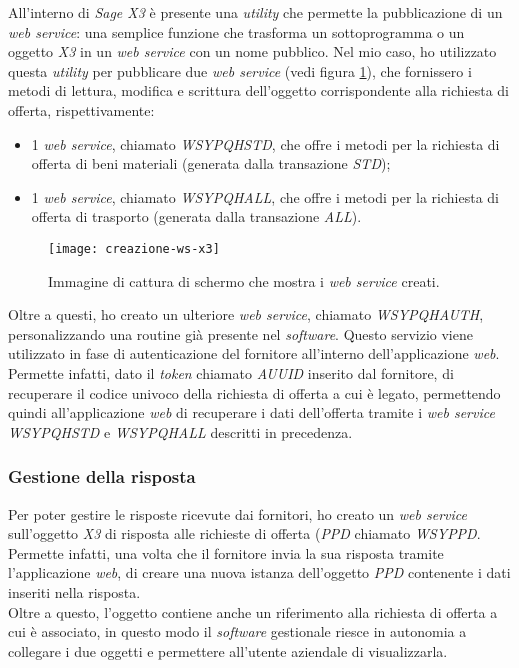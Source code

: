 All'interno di \textit{Sage X3} è presente una \textit{utility} che permette la pubblicazione di un \textit{web service}: una semplice funzione che trasforma un sottoprogramma o un oggetto \textit{X3} in un \textit{web service} con un nome pubblico.
Nel mio caso, ho utilizzato questa \textit{utility} per pubblicare due \textit{web service} (vedi figura \ref{fig:ws-creati}), che fornissero i metodi di lettura, modifica e scrittura dell'oggetto corrispondente alla richiesta di offerta, rispettivamente:
\begin{itemize}
	\item 1 \textit{web service}, chiamato \textit{WSYPQHSTD}, che offre i metodi per la richiesta di offerta di beni materiali (generata dalla transazione \textit{STD}); 
	\item 1 \textit{web service}, chiamato \textit{WSYPQHALL}, che offre i metodi per la richiesta di offerta di trasporto (generata dalla transazione \textit{ALL}).
\end{itemize}


\begin{figure}[htbp]
	\begin{center}
		\texttt{[image: creazione-ws-x3]}
		\caption{Immagine di cattura di schermo che mostra i \textit{web service} creati.}
		\label{fig:ws-creati}
	\end{center}
\end{figure}

Oltre a questi, ho creato un ulteriore \textit{web service}, chiamato \textit{WSYPQHAUTH}, personalizzando una routine già presente nel \textit{software}. 
Questo servizio viene utilizzato in fase di autenticazione del fornitore all'interno dell'applicazione \textit{web}. 
Permette infatti, dato il \textit{token} chiamato \textit{AUUID} inserito dal fornitore, di recuperare il codice univoco della richiesta di offerta a cui è legato, permettendo quindi all'applicazione \textit{web} di recuperare i dati dell'offerta tramite i \textit{web service} \textit{WSYPQHSTD} e \textit{WSYPQHALL} descritti in precedenza.

\subsubsection{Gestione della risposta}
Per poter gestire le risposte ricevute dai fornitori, ho creato un \textit{web service} sull'oggetto \textit{X3} di risposta alle richieste di offerta (\textit{PPD} chiamato \textit{WSYPPD}.
Permette infatti, una volta che il fornitore invia la sua risposta tramite l'applicazione \textit{web}, di creare una nuova istanza dell'oggetto \textit{PPD} contenente i dati inseriti nella risposta.\\
Oltre a questo, l'oggetto contiene anche un riferimento alla richiesta di offerta a cui è associato, in questo modo il \textit{software} gestionale riesce in autonomia a collegare i due oggetti e permettere all'utente aziendale di visualizzarla. 
\vspace{20pt}

